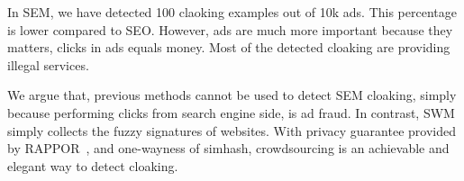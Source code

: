 In SEM, we have detected 100 claoking examples out of 10k ads. This percentage
is lower compared to SEO. However, ads are much more important because they
matters, clicks in ads equals money. Most of the detected cloaking are providing
illegal services.

We argue that, previous methods cannot be used to detect SEM cloaking, simply
because performing clicks from search engine side, is ad fraud. In contrast,
SWM simply collects the fuzzy signatures of websites. With privacy guarantee
provided by RAPPOR~\cite{erlingsson2014rappor}, and one-wayness of simhash,
crowdsourcing is an achievable and elegant way to detect cloaking.

%

